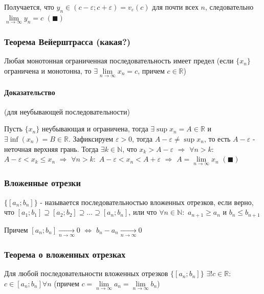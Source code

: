 \documentclass[class=article,a4paper,12pt,crop=false]{standalone}
\begin{document}
Получается, что $y_n \in (c - \varepsilon; c + \varepsilon) = v_{\varepsilon}(c)$ для почти
всех $n$, следовательно $\lim\limits_{n \rightarrow \infty}y_n = c$ $(\blacksquare)$

\subsubsection{Теорема Вейерштрасса (какая?)}

Любая монотонная ограниченная последовательность имеет предел
(если $\{x_n\}$ ограничена и монотонна, то $\exists \lim\limits_{n \rightarrow \infty}x_n = c$, причем $c \in \mathbb{R}$)

\paragraph{Доказательство} (для неубывающей последовательности)

Пусть $\{x_n\}$ неубывающая и ограничена, тогда $\exists \sup{x_n} = A \in \mathbb{R}$ и
$\exists \inf(x_n) = B \in \mathbb{R}$. Зафиксируем $\varepsilon > 0$, тогда $A - \varepsilon \neq \sup{x_n}$,
то есть $A - \varepsilon$ - неточная верхняя грань. Тогда $\exists k \in \mathbb{N}$, что
$x_k > A - \varepsilon$ $\Rightarrow$ $\forall n > k:$ $A - \varepsilon < x_k \leq x_n$
$\Rightarrow$ $\forall n > k:$ $A-\varepsilon < x_n < A + \varepsilon$ $\Rightarrow$
$A = \lim\limits_{n \rightarrow \infty}x_n$ $(\blacksquare)$

\subsubsection{Вложенные отрезки}

$\{[a_n; b_n]\}$ - называется последовательностью вложенных отрезков, если верно, что $[a_1; b_1] \supseteq [a_2; b_2]
\supseteq \dots \supseteq [a_n; b_n]$, или что $\forall n\in \mathbb{N}:$ $a_{n + 1} \geq a_n$ и $b_n \leq b_{n + 1}$

Причем $[a_n; b_n] \underset{n \rightarrow \infty}{\rightarrow} 0$ $\Leftrightarrow$
$b_n - a_n \underset{n \rightarrow \infty}{\rightarrow} 0$

\subsubsection{Теорема о вложенных отрезках}

Для любой последовательности вложенных отрезков $\{[a_n; b_n]\}$ $\exists ! c \in \mathbb{R}:$
$c \in [a_n; b_n] \forall n$ (причем $c = \lim\limits_{n \rightarrow \infty}a_n = \lim\limits_{n \rightarrow \infty}b_n $)
\end{document}
